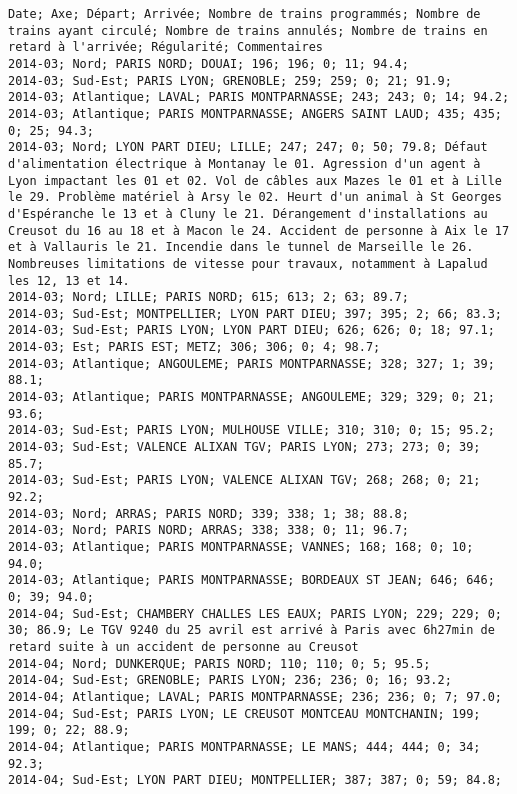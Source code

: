 \documentclass{article}
\begin{document}
    \begin{Verbatim}[commandchars=\\\{\}]
Date; Axe; Départ; Arrivée; Nombre de trains programmés; Nombre de trains ayant circulé; Nombre de trains annulés; Nombre de trains en retard à l'arrivée; Régularité; Commentaires
2014-03; Nord; PARIS NORD; DOUAI; 196; 196; 0; 11; 94.4; 
2014-03; Sud-Est; PARIS LYON; GRENOBLE; 259; 259; 0; 21; 91.9; 
2014-03; Atlantique; LAVAL; PARIS MONTPARNASSE; 243; 243; 0; 14; 94.2; 
2014-03; Atlantique; PARIS MONTPARNASSE; ANGERS SAINT LAUD; 435; 435; 0; 25; 94.3; 
2014-03; Nord; LYON PART DIEU; LILLE; 247; 247; 0; 50; 79.8; Défaut d'alimentation électrique à Montanay le 01. Agression d'un agent à Lyon impactant les 01 et 02. Vol de câbles aux Mazes le 01 et à Lille le 29. Problème matériel à Arsy le 02. Heurt d'un animal à St Georges d'Espéranche le 13 et à Cluny le 21. Dérangement d'installations au Creusot du 16 au 18 et à Macon le 24. Accident de personne à Aix le 17 et à Vallauris le 21. Incendie dans le tunnel de Marseille le 26. Nombreuses limitations de vitesse pour travaux, notamment à Lapalud les 12, 13 et 14.
2014-03; Nord; LILLE; PARIS NORD; 615; 613; 2; 63; 89.7; 
2014-03; Sud-Est; MONTPELLIER; LYON PART DIEU; 397; 395; 2; 66; 83.3; 
2014-03; Sud-Est; PARIS LYON; LYON PART DIEU; 626; 626; 0; 18; 97.1; 
2014-03; Est; PARIS EST; METZ; 306; 306; 0; 4; 98.7; 
2014-03; Atlantique; ANGOULEME; PARIS MONTPARNASSE; 328; 327; 1; 39; 88.1; 
2014-03; Atlantique; PARIS MONTPARNASSE; ANGOULEME; 329; 329; 0; 21; 93.6; 
2014-03; Sud-Est; PARIS LYON; MULHOUSE VILLE; 310; 310; 0; 15; 95.2; 
2014-03; Sud-Est; VALENCE ALIXAN TGV; PARIS LYON; 273; 273; 0; 39; 85.7; 
2014-03; Sud-Est; PARIS LYON; VALENCE ALIXAN TGV; 268; 268; 0; 21; 92.2; 
2014-03; Nord; ARRAS; PARIS NORD; 339; 338; 1; 38; 88.8; 
2014-03; Nord; PARIS NORD; ARRAS; 338; 338; 0; 11; 96.7; 
2014-03; Atlantique; PARIS MONTPARNASSE; VANNES; 168; 168; 0; 10; 94.0; 
2014-03; Atlantique; PARIS MONTPARNASSE; BORDEAUX ST JEAN; 646; 646; 0; 39; 94.0; 
2014-04; Sud-Est; CHAMBERY CHALLES LES EAUX; PARIS LYON; 229; 229; 0; 30; 86.9; Le TGV 9240 du 25 avril est arrivé à Paris avec 6h27min de retard suite à un accident de personne au Creusot
2014-04; Nord; DUNKERQUE; PARIS NORD; 110; 110; 0; 5; 95.5; 
2014-04; Sud-Est; GRENOBLE; PARIS LYON; 236; 236; 0; 16; 93.2; 
2014-04; Atlantique; LAVAL; PARIS MONTPARNASSE; 236; 236; 0; 7; 97.0; 
2014-04; Sud-Est; PARIS LYON; LE CREUSOT MONTCEAU MONTCHANIN; 199; 199; 0; 22; 88.9; 
2014-04; Atlantique; PARIS MONTPARNASSE; LE MANS; 444; 444; 0; 34; 92.3; 
2014-04; Sud-Est; LYON PART DIEU; MONTPELLIER; 387; 387; 0; 59; 84.8; 

\end{Verbatim}
\end{document}
